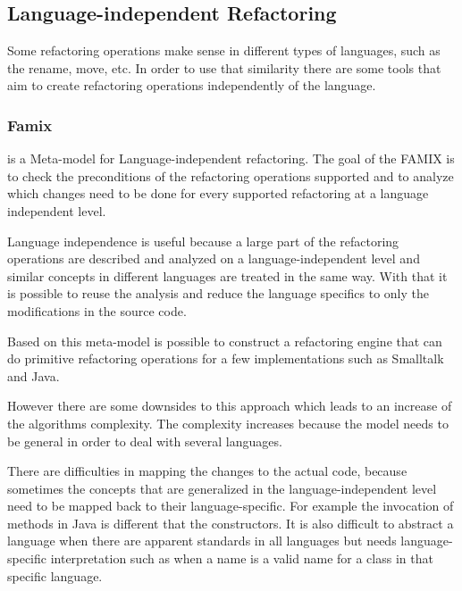 




\subsection{Language-independent Refactoring} %
Some refactoring operations make sense in different types of languages, such as the rename, move, etc. In order to use that similarity there are some tools that aim to create refactoring operations independently of the language. 

\subsubsection{Famix}
\cite{tichelaar2000meta} is a  Meta-model for Language-independent refactoring.
The goal of the FAMIX is to check the preconditions of the refactoring operations supported and to analyze which changes need to be done for every supported refactoring at a language independent level.

Language independence is useful because a large part of the refactoring operations are described and analyzed on a language-independent level and similar concepts in different languages are treated in the same way. 
With that it is possible to reuse the analysis and reduce the language specifics to only the modifications in the source code.

Based on this meta-model is possible to construct a refactoring engine that can do primitive refactoring operations for a few implementations such as Smalltalk and Java.

However there are some downsides to this approach which leads to an increase of the algorithms complexity. 
The complexity increases because the model needs to be general in order to deal with several languages. 

There are difficulties in mapping the changes to the actual code, because sometimes the concepts that are generalized in the language-independent level need to be mapped back to their language-specific.
For example the invocation of methods in Java is different that the constructors.
It is also difficult to abstract a language when there are apparent standards in all languages but needs language-specific interpretation such as when a name is a valid name for a class in that specific language.

